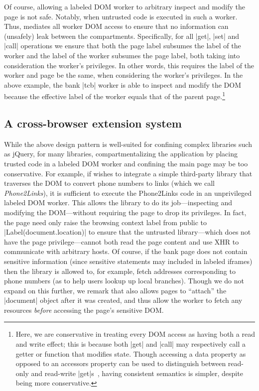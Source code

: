 Of course, allowing a labeled DOM worker to arbitrary inspect and
modify the page is not safe.
%
Notably, when untrusted code is executed in such a worker.
%
Thus, \sys{} mediates all worker DOM access to ensure that no information can
(unsafely) leak between the compartments.
%
Specifically, for all \js|get|, \js|set| and \js|call| operations we
ensure that both the page label subsumes the label of the worker 
and the label of the worker subsumes the page label,
both taking into consideration the worker's privileges.
%
In other words, this requires the label of the worker and page be the same,
when considering the worker's privileges.
%
In the above example, the bank \js|tcb| worker is able to inspect and
modify the DOM because the effective label of the worker equals that
of the parent page.\footnote{
%
Here, we are conservative in treating every DOM access as
having both a read and write effect;
%
this is because both \js|get| and \js|call| may respectively call a getter or
function that modifies state.
%
Though accessing a data property as opposed to an accessors property
can be used to distinguish between read-only and read-write
\js|get|s~\cite{ecma}, having consistent semantics is simpler,
despite being more conservative.
}
%


\subsection{A cross-browser extension system}
\label{sec:system:extension}

While the above design pattern is well-suited for confining complex libraries
such as jQuery, for many libraries, compartmentalizing the application by
placing trusted code in a labeled DOM worker and confining the main
page may be too conservative.
%
For example, if  wishes to integrate a simple
third-party library that traverses the DOM to convert phone numbers to
links (which we call \emph{Phone2Links}), it is sufficient to execute
the Phone2Links code in an unprivileged labeled DOM worker.
%
This allows the library to do its job---inspecting and modifying the
DOM---without requiring the page to drop its privileges.
%
In fact, the page need only raise the browsing context label from
public to \js|Label(document.location)| to ensure that the untrusted
library---which does not have the page privilege---cannot both read
the page content and use XHR to communicate with arbitrary hosts.
%
Of course, if the bank page does not contain sensitive information
(since sensitive statements may included in labeled iframes) then the
library is allowed to, for example, fetch addresses corresponding to
phone numbers (as to help users lookup up local branches).
%
Though we do not expand on this further, we remark that \sys{} also
allows pages to ``attach'' the \js|document| object after it was
created, and thus allow the worker to fetch any resources
\emph{before} accessing the page's sensitive DOM.

